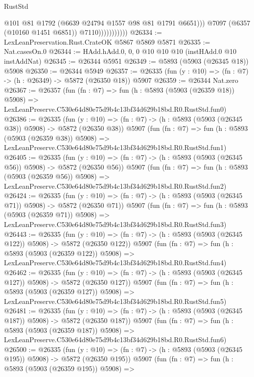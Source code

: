 \begin{lexlean}{RustStd}
\begin{coremodule}
                              @101
                              @81
                              @1792
                              (@6639 @24794 @1557 @98 @81 @1791 @6651)))
                          @7097
                          (@6357 (@10160 @1451 @6851))
                          @7110)))))))))))
@26334 := LexLeanPreservation.Rust.CrateOK @5867 @5869 @5871
@26335 := Nat.casesOn.{0}
@26344 := HAdd.hAdd.{0, 0, 0} @10 @10 @10 (instHAdd.{0} @10 instAddNat)
@26345 := @26344 @5951
@26349 := @5893 (@5903 (@26345 @18)) @5908
@26350 := @26344 @5949
@26357 := @26335 (fun (y : @10) => (fn : @7) -> (h : @26349) -> @5872 (@26350 @18)) @5907
@26359 := @26344 Nat.zero
@26367 := @26357
    (fun (fn : @7) =>
    fun (h : @5893 (@5903 (@26359 @18)) @5908) =>
    LexLeanPreserve.C530e64d80e75d9b4c13bf34d629b18bd.R0.RustStd.fun0)
@26386 := @26335
    (fun (y : @10) => (fn : @7) -> (h : @5893 (@5903 (@26345 @38)) @5908) -> @5872 (@26350 @38))
    @5907
    (fun (fn : @7) =>
    fun (h : @5893 (@5903 (@26359 @38)) @5908) =>
    LexLeanPreserve.C530e64d80e75d9b4c13bf34d629b18bd.R0.RustStd.fun1)
@26405 := @26335
    (fun (y : @10) => (fn : @7) -> (h : @5893 (@5903 (@26345 @56)) @5908) -> @5872 (@26350 @56))
    @5907
    (fun (fn : @7) =>
    fun (h : @5893 (@5903 (@26359 @56)) @5908) =>
    LexLeanPreserve.C530e64d80e75d9b4c13bf34d629b18bd.R0.RustStd.fun2)
@26424 := @26335
    (fun (y : @10) => (fn : @7) -> (h : @5893 (@5903 (@26345 @71)) @5908) -> @5872 (@26350 @71))
    @5907
    (fun (fn : @7) =>
    fun (h : @5893 (@5903 (@26359 @71)) @5908) =>
    LexLeanPreserve.C530e64d80e75d9b4c13bf34d629b18bd.R0.RustStd.fun3)
@26443 := @26335
    (fun (y : @10) => (fn : @7) -> (h : @5893 (@5903 (@26345 @122)) @5908) -> @5872 (@26350 @122))
    @5907
    (fun (fn : @7) =>
    fun (h : @5893 (@5903 (@26359 @122)) @5908) =>
    LexLeanPreserve.C530e64d80e75d9b4c13bf34d629b18bd.R0.RustStd.fun4)
@26462 := @26335
    (fun (y : @10) => (fn : @7) -> (h : @5893 (@5903 (@26345 @127)) @5908) -> @5872 (@26350 @127))
    @5907
    (fun (fn : @7) =>
    fun (h : @5893 (@5903 (@26359 @127)) @5908) =>
    LexLeanPreserve.C530e64d80e75d9b4c13bf34d629b18bd.R0.RustStd.fun5)
@26481 := @26335
    (fun (y : @10) => (fn : @7) -> (h : @5893 (@5903 (@26345 @187)) @5908) -> @5872 (@26350 @187))
    @5907
    (fun (fn : @7) =>
    fun (h : @5893 (@5903 (@26359 @187)) @5908) =>
    LexLeanPreserve.C530e64d80e75d9b4c13bf34d629b18bd.R0.RustStd.fun6)
@26500 := @26335
    (fun (y : @10) => (fn : @7) -> (h : @5893 (@5903 (@26345 @195)) @5908) -> @5872 (@26350 @195))
    @5907
    (fun (fn : @7) =>
    fun (h : @5893 (@5903 (@26359 @195)) @5908) =>

\end{coremodule}
\end{lexlean}
